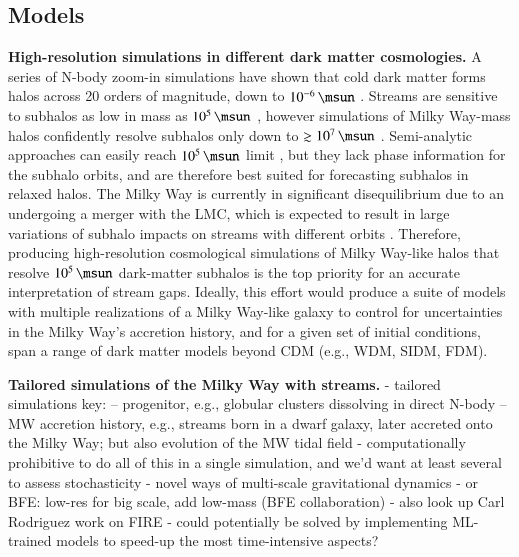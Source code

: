 \documentclass[final,5p,times,twocolumn,authoryear]{elsarticle}
\begin{document}
\subsection{Models}
\textbf{High-resolution simulations in different dark matter cosmologies.}
A series of N-body zoom-in simulations have shown that cold dark matter forms halos across 20 orders of magnitude, down to $10^{-6}\,\unit{\msun}$ \citep[approximately Earth mass,][]{diemand:2005, springel:2008, wangj:2020}.
Streams are sensitive to subhalos as low in mass as $10^5\,\unit{\msun}$ \citep[Figure~\ref{}, see also][]{drlica-wagner:2019}, however simulations of Milky Way-mass halos confidently resolve subhalos only down to $\gtrsim10^7\,\unit{\msun}$ \citep[cf.][]{wetzel:2016, richings:2020, nadler:2023, mansfield:2023}.
Semi-analytic approaches can easily reach $10^5\,\unit{\msun}$ limit \citep[][]{benson,}, but they lack phase information for the subhalo orbits, and are therefore best suited for forecasting subhalos in relaxed halos.
The Milky Way is currently in significant disequilibrium due to an undergoing a merger with the LMC, which is expected to result in large variations of subhalo impacts on streams with different orbits \citep{barry:2023,arora:2023}.
Therefore, producing high-resolution cosmological simulations of Milky Way-like halos that resolve $10^5\,\unit{\msun}$ dark-matter subhalos is the top priority for an accurate interpretation of stream gaps.
Ideally, this effort would produce a suite of models with multiple realizations of a Milky Way-like galaxy to control for uncertainties in the Milky Way's accretion history, and for a given set of initial conditions, span a range of dark matter models beyond CDM (e.g., WDM, SIDM, FDM).




\textbf{Tailored simulations of the Milky Way with streams.}
- tailored simulations key:
-- progenitor, e.g., globular clusters dissolving in direct N-body
-- MW accretion history, e.g., streams born in a dwarf galaxy, later accreted onto the Milky Way; but also evolution of the MW tidal field
- computationally prohibitive to do all of this in a single simulation, and we'd want at least several to assess stochasticity
- novel ways of multi-scale gravitational dynamics
- or BFE: low-res for big scale, add low-mass (BFE collaboration)
- also look up Carl Rodriguez work on FIRE
- could potentially be solved by implementing ML-trained models to speed-up the most time-intensive aspects?
\end{document}
